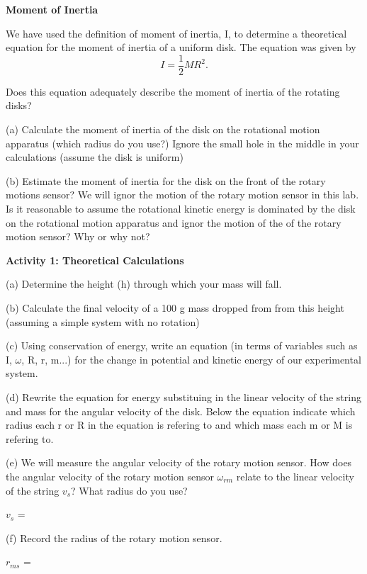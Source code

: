 \textbf{Moment of Inertia} 

We have used the definition of moment of inertia, I, to determine a theoretical equation for the moment of inertia of a uniform disk.  The equation was given by
\[
I=\frac{1}{2}MR^{2}.\]

Does this equation adequately describe the moment of inertia of the rotating disks? 

\answerspace{3mm} 

(a) Calculate the moment of inertia of the disk on the rotational motion apparatus (which radius do you use?) Ignore the small hole in the middle in your calculations (assume the disk is uniform)
 \answerspace{15mm}
 
(b) Estimate the moment of inertia for the disk on the front of the rotary motions sensor? We will ignor the motion of the rotary motion sensor in this lab. Is it reasonable to assume the rotational kinetic energy is dominated by the disk on the rotational motion apparatus and ignor the motion of the of the rotary motion sensor? Why or why not?
 \answerspace{15mm}


\textbf{Activity 1: Theoretical Calculations}

(a) Determine the height (h) through which your mass will fall.
\answerspace{5mm}

(b) Calculate the final velocity of a 100 g mass dropped from from this height (assuming a simple system with no rotation)
\answerspace{10mm} 

(c) Using conservation of energy, write an equation (in terms of variables such as I, \( \omega \), R, r, m...) for the change in potential and kinetic energy of our experimental system.
\answerspace{10mm}

(d) Rewrite the equation for energy substituing in the linear velocity of the string and mass for the angular velocity of the disk. Below the equation indicate which radius each r or R in the equation is refering to and which mass each m or M is refering to. 
\answerspace{20mm}


(e) We will measure the angular velocity of the rotary motion sensor. How does the angular velocity of the rotary motion sensor \( \omega_{rm}\) relate to the  
linear velocity of the string \( v_{s}\)? What radius do you use? 

\( v_{s}\) =
\answerspace{5mm}

(f) Record the radius of the rotary motion sensor.

\( r_{ms}\) =
\answerspace{3mm}

